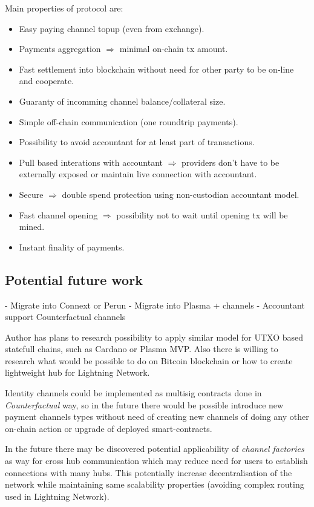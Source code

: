 \documentclass[a4paper,12pt]{article}
\begin{document}
Main properties of protocol are:

\begin{itemize}
  \item Easy paying channel topup (even from exchange).
  \item Payments aggregation $\Longrightarrow$ minimal on-chain tx amount.
  \item Fast settlement into blockchain without need for other party to be on-line
  and cooperate.
  \item Guaranty of incomming channel balance/collateral size.
  \item Simple off-chain communication (one roundtrip payments).
  \item Possibility to avoid accountant for at least part of transactions.
  \item Pull based interations with accountant $\Longrightarrow$ providers don't have to
  be externally exposed or maintain live connection with accountant.
  \item Secure $\Longrightarrow$ double spend protection using non-custodian accountant
  model.
  \item Fast channel opening $\Longrightarrow$ possibility not to wait until opening tx
   will be mined.
  \item Instant finality of payments.
\end{itemize}

\subsection{Potential future work}

- Migrate into Connext or Perun 
- Migrate into Plasma + channels
- Accountant support Counterfactual channels


Author has plans to research possibility to apply similar model for UTXO based statefull 
chains, such as Cardano or Plasma MVP. Also there is willing to research what would be 
possible to do on Bitcoin blockchain or how to create lightweight hub for Lightning 
Network.

Identity channels could be implemented as multisig contracts done in 
\textit{Counterfactual} \cite{counterfactual} way, so in the future there would be 
possible introduce new payment channels types without need of creating new channels of 
doing any other on-chain action or upgrade of deployed smart-contracts. 

In the future there may be discovered potential applicability of \textit{channel 
factories} \cite{factories} as way for cross hub communication which may reduce need 
for users to establish connections with many hubs. This potentially increase 
decentralisation of the network while maintaining same scalability properties (avoiding 
complex routing used in Lightning Network).


\newpage
\printbibliography[heading=bibintoc]
\end{document}
